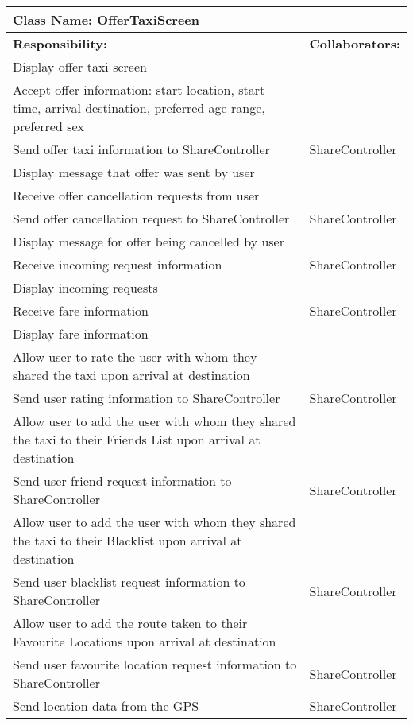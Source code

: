 \documentclass[english]{article}
\begin{document}
    \begin{table}[!ht]
        \centering
        \begin{tabular}{|p{8cm}|p{4cm}|}
        \hline 
        \multicolumn{2}{|l|}{\textbf{Class Name: OfferTaxiScreen}} \\
        \hline
        \textbf{Responsibility:} & \textbf{Collaborators:} \\
        \hline
        Display offer taxi screen & \\
        \hline
        Accept offer information: start location, start time, arrival destination, preferred age range, preferred sex & \\
        \hline
        Send offer taxi information to ShareController & ShareController \\
        \hline
        Display message that offer was sent by user & \\
        \hline
        Receive offer cancellation requests from user & \\
        \hline
        Send offer cancellation request to ShareController & ShareController \\
        \hline
        Display message for offer being cancelled by user & \\
        \hline
        Receive incoming request information & ShareController \\
        \hline
        Display incoming requests & \\
        \hline
        Receive fare information & ShareController \\
        \hline
        Display fare information & \\
        \hline
        Allow user to rate the user with whom they shared the taxi upon arrival at destination & \\
        \hline
        Send user rating information to ShareController & ShareController \\
        \hline
        Allow user to add the user with whom they shared the taxi to their Friends List upon arrival at destination & \\
        \hline
        Send user friend request information to ShareController & ShareController \\
        \hline
        Allow user to add the user with whom they shared the taxi to their Blacklist upon arrival at destination & \\
        \hline
        Send user blacklist request information to ShareController & ShareController \\
        \hline
        Allow user to add the route taken to their Favourite Locations upon arrival at destination & \\
        \hline
        Send user favourite location request information to ShareController & ShareController \\
        \hline
        Send location data from the GPS & ShareController \\
        \hline
        \end{tabular}
    \end{table}
    
\end{document}
